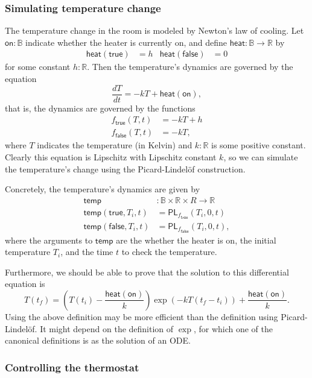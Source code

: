 \documentclass{article}           %
\newcommand{\R}{\mathbb{R}}
\newcommand{\bool}{\mathbb{B}}
\begin{document}
\subsubsection{Simulating temperature change}

The temperature change in the room is modeled by Newton's law of cooling. Let $\mathsf{on} : \bool$ indicate whether the heater is currently on, and define $\mathsf{heat} : \bool \to \R$ by
\begin{align*}
\mathsf{heat}(\mathsf{true}) &= h
&
\mathsf{heat}(\mathsf{false}) &= 0
\end{align*}
for some constant $h : \R$. Then the temperature's dynamics are governed by the equation
\[
\frac{dT}{dt} = -kT + \mathsf{heat}(\mathsf{on}),
\]
that is, the dynamics are governed by the functions
\begin{align*}
f_\mathsf{true}(T, t) &= -kT + h
\\ f_\mathsf{false}(T, t) &= -kT,
\end{align*}
where $T$ indicates the temperature (in Kelvin) and $k : \R$ is some positive constant. Clearly this equation is Lipschitz with Lipschitz constant $k$, so we can simulate the temperature's change using the Picard-Lindelöf construction.

Concretely, the temperature's dynamics are given by
\begin{align*}
\mathsf{temp} &: \bool \times \R \times R \to \R
\\ \mathsf{temp}(\mathsf{true}, T_i, t) &= \mathsf{PL}_{f_\mathsf{true}}(T_i, 0, t)
\\ \mathsf{temp}(\mathsf{false}, T_i, t) &= \mathsf{PL}_{f_\mathsf{false}}(T_i, 0, t),
\end{align*}
where the arguments to $\mathsf{temp}$ are the whether the heater is on, the initial temperature $T_i$, and the time $t$ to check the temperature.

Furthermore, we should be able to prove that the solution to this differential equation is
\[
T(t_f) = \left( T(t_i) - \frac{\mathsf{heat}(\mathsf{on})}{k}\right) \exp\left(-kT(t_f - t_i) \right) + \frac{\mathsf{heat}(\mathsf{on})}{k}.
\]
Using the above definition may be more efficient than the definition using Picard-Lindelöf. It might depend on the definition of $\exp$, for which one of the canonical definitions is as the solution of an ODE.

\subsubsection{Controlling the thermostat}
\end{document}
